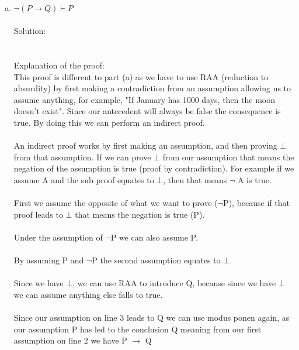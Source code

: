 \documentclass{article}
\newcommand*\moveToRight[1]{\hspace*{0em plus 1fill}\makebox{(#1)}}
\begin{document}
\begin{enumerate}[(a)]
        \item $\neg(P \to Q)\vdash P$\moveToRight{10 marks}\\\\
        Solution:\\
        \\\\
        Explanation of the proof:\\
        This proof is different to part (a) as we have to use RAA (reduction to absurdity) by first making a contradiction from an assumption allowing us to assume anything, for example, "If January has 1000 days, then the moon doesn't exist". Since our antecedent will always be false the consequence is true. By doing this we can perform an indirect proof.
        \\\\An indirect proof works by first making an assumption, and then proving $\bot$ from that assumption. If we can prove $\bot$ from our assumption that means the negation of the assumption is true (proof by contradiction). For example if we assume A and the sub proof equates to $\bot$, then that means $\neg$ A is true.
        \\\\First we assume the opposite of what we want to prove ($\neg$P), because if that proof leads to $\bot$ that means the negation is true (P). 
        \\\\Under the assumption of $\neg$P we can also assume P.
        \\\\By assuming P and $\neg$P the second assumption equates to $\bot$.
        \\\\Since we have $\bot$, we can use RAA to introduce Q, because since we have $\bot$ we can assume anything else falls to true.
        \\\\Since our assumption on line 3 leads to Q we can use modus ponen again, as our assumption P has led to the conclusion Q meaning from our first assumption on line 2 we have P $\to$ Q

\end{enumerate}
\end{document}
